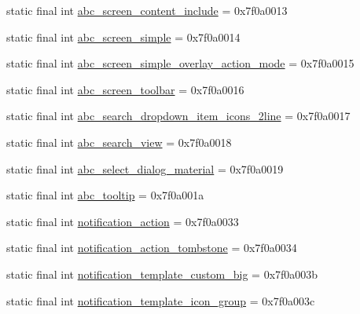 \begin{DoxyCompactItemize}
\item 
static final int \mbox{\hyperlink{classandroid_1_1support_1_1v7_1_1appcompat_1_1_r_1_1layout_a1193e05438a3988d8cebb0a4810fabc1}{abc\+\_\+screen\+\_\+content\+\_\+include}} = 0x7f0a0013
\item 
static final int \mbox{\hyperlink{classandroid_1_1support_1_1v7_1_1appcompat_1_1_r_1_1layout_a46cabee4c1c1c293c63a99e850973847}{abc\+\_\+screen\+\_\+simple}} = 0x7f0a0014
\item 
static final int \mbox{\hyperlink{classandroid_1_1support_1_1v7_1_1appcompat_1_1_r_1_1layout_acc248e0178ddf81d8ec0eb5056424a5d}{abc\+\_\+screen\+\_\+simple\+\_\+overlay\+\_\+action\+\_\+mode}} = 0x7f0a0015
\item 
static final int \mbox{\hyperlink{classandroid_1_1support_1_1v7_1_1appcompat_1_1_r_1_1layout_addd57f53331cb1ff5fd2c53e61bf2805}{abc\+\_\+screen\+\_\+toolbar}} = 0x7f0a0016
\item 
static final int \mbox{\hyperlink{classandroid_1_1support_1_1v7_1_1appcompat_1_1_r_1_1layout_a43434db42002b5872fd031eaaea46488}{abc\+\_\+search\+\_\+dropdown\+\_\+item\+\_\+icons\+\_\+2line}} = 0x7f0a0017
\item 
static final int \mbox{\hyperlink{classandroid_1_1support_1_1v7_1_1appcompat_1_1_r_1_1layout_a424314fba766e6fc9c6e6b71ccc00fff}{abc\+\_\+search\+\_\+view}} = 0x7f0a0018
\item 
static final int \mbox{\hyperlink{classandroid_1_1support_1_1v7_1_1appcompat_1_1_r_1_1layout_a1f6651d158db2337019984ab97f60e22}{abc\+\_\+select\+\_\+dialog\+\_\+material}} = 0x7f0a0019
\item 
static final int \mbox{\hyperlink{classandroid_1_1support_1_1v7_1_1appcompat_1_1_r_1_1layout_a20cae5f2a4ee56a5e5c0b1e75a9559be}{abc\+\_\+tooltip}} = 0x7f0a001a
\item 
static final int \mbox{\hyperlink{classandroid_1_1support_1_1v7_1_1appcompat_1_1_r_1_1layout_afe7cf82e60de09f99402960853d3ee0f}{notification\+\_\+action}} = 0x7f0a0033
\item 
static final int \mbox{\hyperlink{classandroid_1_1support_1_1v7_1_1appcompat_1_1_r_1_1layout_a65fed226da4d733de3068d4a15cc5b55}{notification\+\_\+action\+\_\+tombstone}} = 0x7f0a0034
\item 
static final int \mbox{\hyperlink{classandroid_1_1support_1_1v7_1_1appcompat_1_1_r_1_1layout_a3207d2343821a6e1822345fbff858699}{notification\+\_\+template\+\_\+custom\+\_\+big}} = 0x7f0a003b
\item 
static final int \mbox{\hyperlink{classandroid_1_1support_1_1v7_1_1appcompat_1_1_r_1_1layout_ab83401c918fc5f08cbb6820f8587ae41}{notification\+\_\+template\+\_\+icon\+\_\+group}} = 0x7f0a003c

\end{DoxyCompactItemize}

